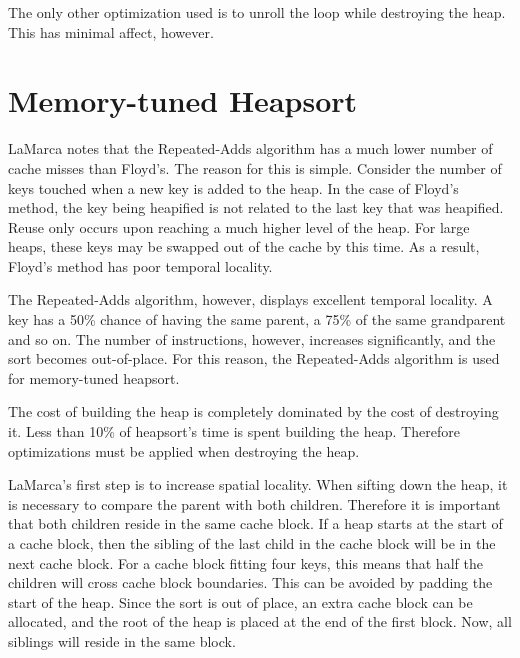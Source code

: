 The only other optimization used is to unroll the loop while destroying the
heap. This has minimal affect, however.

\section{Memory-tuned Heapsort}
\label{memory-tuned heapsort}
LaMarca notes that the Repeated-Adds algorithm has a much lower number of cache
misses than Floyd's. The reason for this is simple. Consider the number of keys 
touched when a new key is added to the heap. In the case of Floyd's method, the
key being heapified is not related to the last key that was heapified. Reuse
only occurs upon reaching a much higher level of the heap. For large heaps, these
keys may be swapped out of the cache by this time. As a result, Floyd's method
has poor temporal locality.

The Repeated-Adds algorithm, however, displays excellent temporal locality. A
key has a 50\% chance of having the same parent, a 75\% of the same grandparent
and so on. The number of instructions, however, increases significantly, and the
sort becomes out-of-place. For this reason, the Repeated-Adds algorithm is used
for memory-tuned heapsort.

The cost of building the heap is completely dominated by the cost of
destroying it. Less than 10\% of heapsort's time is spent building the heap.
Therefore optimizations must be applied when destroying the heap.

LaMarca's first step is to increase spatial locality. When sifting down the
heap, it is necessary to compare the parent with both children. Therefore it is
important that both children reside in the same cache block. If a heap starts at
the start of a cache block, then the sibling of the last child in the cache
block will be in the next cache block.  For a cache block fitting four keys,
this means that half the children will cross cache block boundaries. This can be
avoided by padding the start of the heap. Since the sort is out of place, an
extra cache block can be allocated, and the root of the heap is placed at the end of
the first block. Now, all siblings will reside in the same block.

\begin{figure}[h]
\centering
{}
\end{figure}

